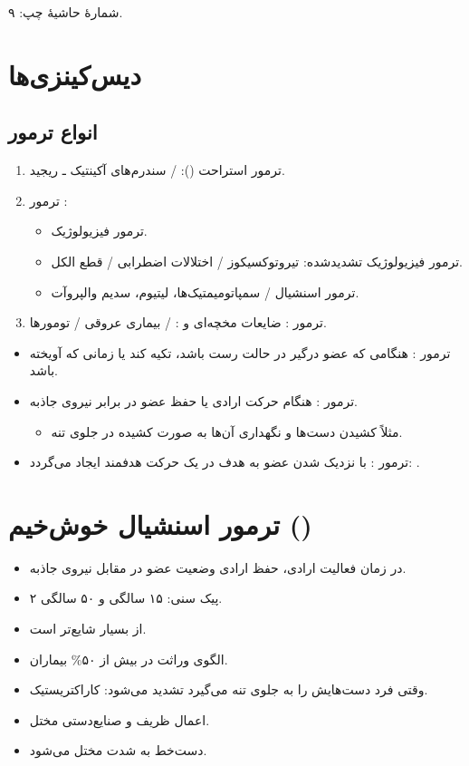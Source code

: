 \documentclass[a4paper,12pt]{extbook}
\begin{document}
\noindent شمارهٔ حاشیهٔ چپ: ۹.
\section*{دیس‌کینزی‌ها}
\subsection*{انواع ترمور}
\begin{enumerate}[label=\alph*)]
\item ترمور استراحت ():  / سندرم‌های آکینتیک ـ ریجید.
\item ترمور :
\begin{itemize}
\item ترمور فیزیولوژیک.
\item ترمور فیزیولوژیک تشدیدشده: تیروتوکسیکوز / اختلالات اضطرابی / قطع الکل.
\item ترمور اسنشیال / سمپاتومیمتیک‌ها، لیتیوم، سدیم والپروآت.
\end{itemize}
\item ترمور : ضایعات مخچه‌ای و :  / بیماری عروقی / تومورها.
\end{enumerate}
\begin{itemize}
\item ترمور : هنگامی که عضو درگیر در حالت رست باشد، تکیه کند یا زمانی که آویخته باشد.
\item ترمور : هنگام حرکت ارادی یا حفظ عضو در برابر نیروی جاذبه.
\begin{itemize}
\item مثلاً کشیدن دست‌ها و نگهداری آن‌ها به صورت کشیده در جلوی تنه.
\end{itemize}
\item ترمور : با نزدیک شدن عضو به هدف در یک حرکت هدفمند ایجاد می‌گردد: .
\end{itemize}
\section*{ترمور اسنشیال خوش‌خیم ()}
\begin{itemize}
\item در زمان فعالیت ارادی، حفظ ارادی وضعیت عضو در مقابل نیروی جاذبه.
\item ۲ پیک سنی: ۱۵ سالگی و ۵۰ سالگی.
\item از  بسیار شایع‌تر است.
\item الگوی وراثت  در بیش از ۵۰\% بیماران.
\item وقتی فرد دست‌هایش را به جلوی تنه می‌گیرد تشدید می‌شود: کاراکتریستیک.
\item اعمال ظریف و صنایع‌دستی مختل.
\item دست‌خط به شدت مختل می‌شود.
\end{itemize}
\end{document}

